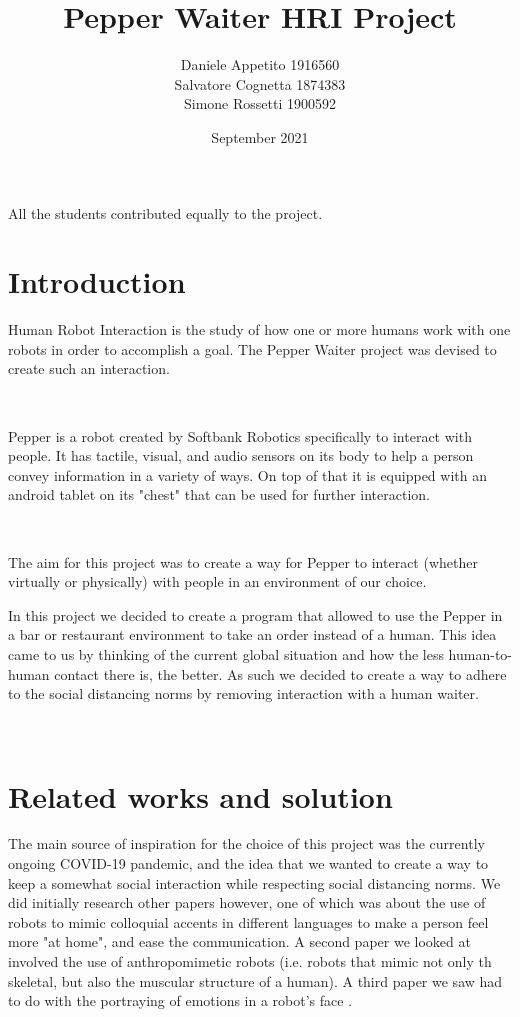\documentclass[12pt, letterpaper, twoside]{article}
\title{Pepper Waiter HRI Project}
\author{Daniele Appetito 1916560\\
 Salvatore Cognetta 1874383\\
  Simone Rossetti 1900592}
\date{September 2021}
\begin{document}
\begin{titlepage}
\maketitle
\end{titlepage}

\clearpage
\thispagestyle{empty}
\vspace*{\fill}
All the students contributed equally to the project.
\vspace*{\fill}
\clearpage


\tableofcontents

\newpage
    
\newpage
\section{Introduction}

Human Robot Interaction is the study of how one or more humans work with one robots in order to accomplish a goal. The Pepper Waiter project was devised to create such an interaction. 

\

Pepper is a robot created by Softbank Robotics specifically to interact with people. It has tactile, visual, and audio sensors on its body to help a person convey  information in a variety of ways. On top of that it is equipped with an android tablet on its "chest" that can be used for further interaction. 

\

The aim for this project was to create a way for Pepper to interact (whether virtually or physically) with people in an environment of our choice. 

In this project we decided to create a program that allowed to use the Pepper in a bar or restaurant environment to take an order instead of a human. This idea came to us by thinking of the current global situation and how the less human-to-human contact there is, the better. As such we decided to create a way to adhere to the social distancing norms by removing interaction with a human waiter. 


\


\section{Related works and solution}

The main source of inspiration for the choice of this project was the currently ongoing COVID-19 pandemic, and the idea that we wanted to create a way to keep a somewhat social interaction while respecting social distancing norms. We did initially research other papers however, one of which was about the use of robots to mimic colloquial accents \cite{10.3115/976909.979652} in different languages to make a person feel more "at home", and ease the communication. A second paper we looked at involved the use of anthropomimetic robots \cite{Wittmeier2013TowardAR} (i.e. robots that mimic not only th skeletal, but also the muscular structure of a human). A third paper we saw had to do with the portraying of emotions in a robot's face \cite{BREAZEAL2003119}. 
\end{document}
